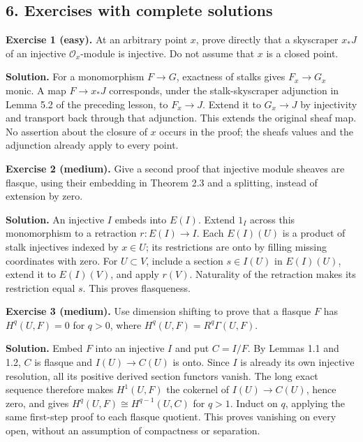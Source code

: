 \documentclass[
  english,
  11pt,
  a4paper,
]{article}
\begin{document}
\subsection{6. Exercises with complete
solutions}\label{injective-modules-and-bounded-below-derived-functors--6-exercises-with-complete-solutions}

\textbf{Exercise 1 (easy).} At an arbitrary point \(x\), prove directly
that a skyscraper \(x_*J\) of an injective \(\mathcal O_x\)-module is
injective. Do not assume that \(x\) is a closed point.

\textbf{Solution.} For a monomorphism \(F\to G\), exactness of stalks
gives \(F_x\to G_x\) monic. A map \(F\to x_*J\) corresponds, under the
stalk-skyscraper adjunction in Lemma 5.2 of the preceding lesson, to
\(F_x\to J\). Extend it to \(G_x\to J\) by injectivity and transport
back through that adjunction. This extends the original sheaf map. No
assertion about the closure of \(x\) occurs in the proof; the
sheaf\textquotesingle s values and the adjunction already apply to every
point.

\textbf{Exercise 2 (medium).} Give a second proof that injective module
sheaves are flasque, using their embedding in Theorem 2.3 and a
splitting, instead of extension by zero.

\textbf{Solution.} An injective \(I\) embeds into \(E(I)\). Extend
\(1_I\) across this monomorphism to a retraction \(r:E(I)\to I\). Each
\(E(I)(U)\) is a product of stalk injectives indexed by \(x\in U\); its
restrictions are onto by filling missing coordinates with zero. For
\(U\subset V\), include a section \(s\in I(U)\) in \(E(I)(U)\), extend
it to \(E(I)(V)\), and apply \(r(V)\). Naturality of the retraction
makes its restriction equal \(s\). This proves flasqueness.

\textbf{Exercise 3 (medium).} Use dimension shifting to prove that a
flasque \(F\) has \(H^q(U,F)=0\) for \(q>0\), where
\(H^q(U,F)=R^q\Gamma(U,F)\).

\textbf{Solution.} Embed \(F\) into an injective \(I\) and put
\(C=I/F\). By Lemmas 1.1 and 1.2, \(C\) is flasque and \(I(U)\to C(U)\)
is onto. Since \(I\) is already its own injective resolution, all its
positive derived section functors vanish. The long exact sequence
therefore makes \(H^1(U,F)\) the cokernel of \(I(U)\to C(U)\), hence
zero, and gives \(H^q(U,F)\cong H^{q-1}(U,C)\) for \(q>1\). Induct on
\(q\), applying the same first-step proof to each flasque quotient. This
proves vanishing on every open, without an assumption of compactness or
separation.
\end{document}
